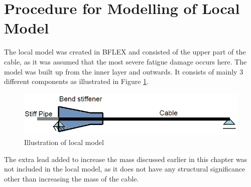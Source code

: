 \section{Procedure for Modelling of Local Model}
\label{sec:localmodel}
The local model was created in BFLEX and consisted of the upper part of the cable, as it was assumed that the most severe fatigue damage occurs here. The model was built up from the inner layer and outwards. It consists of mainly 3 different components as illustrated in Figure \ref{fig:localmod}.
\begin{figure}[H]
\centering
\includegraphics[scale=0.7]{figures/localmod.png}
\caption [$\; \:$Illustration of local model]{Illustration of local model}
 \label{fig:localmod}
\end{figure}
The extra lead added to increase the mass discussed earlier in this chapter was not included in the local model, as it does not have any structural significance other than increasing the mass of the cable.\newline
\newline
